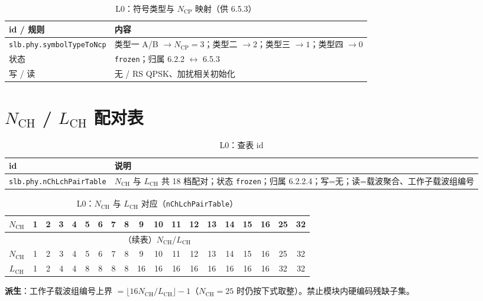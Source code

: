 \documentclass[11pt,a4paper]{ctexart}
\begin{document}
\begin{longtable}{L{4.5cm}L{10.2cm}}
\caption{L0：符号类型与 $N_{\mathrm{CP}}$ 映射（供 6.5.3）\label{tab:l0-ncp}} \\
\toprule
\textbf{id / 规则} & \textbf{内容} \\
\midrule
\texttt{slb.phy.symbolTypeToNcp} &
类型一 A/B $\rightarrow N_{\mathrm{CP}}=3$；类型二 $\rightarrow 2$；类型三 $\rightarrow 1$；类型四 $\rightarrow 0$ \\
状态 & \texttt{frozen}；归属 6.2.2 $\leftrightarrow$ 6.5.3 \\
写 / 读 & 无 / RS QPSK、加扰相关初始化 \\
\bottomrule
\end{longtable}

\section{$N_{\mathrm{CH}}$ / $L_{\mathrm{CH}}$ 配对表}

\begin{longtable}{L{4.5cm}L{10.2cm}}
\caption{L0：查表 id\label{tab:l0-nch-id}} \\
\toprule
\textbf{id} & \textbf{说明} \\
\midrule
\texttt{slb.phy.nChLchPairTable} &
$N_{\mathrm{CH}}$ 与 $L_{\mathrm{CH}}$ 共 18 档配对；状态 \texttt{frozen}；归属 6.2.2.4；写=无；读=载波聚合、工作子载波组编号 \\
\bottomrule
\end{longtable}

\begin{longtable}{c*{18}{c}}
\caption{L0：$N_{\mathrm{CH}}$ 与 $L_{\mathrm{CH}}$ 对应（\texttt{nChLchPairTable}）\label{tab:l0-nch-lch}} \\
\toprule
$N_{\mathrm{CH}}$ &
1 & 2 & 3 & 4 & 5 & 6 & 7 & 8 & 9 & 10 & 11 & 12 & 13 & 14 & 15 & 16 & 25 & 32 \\
\midrule
\endfirsthead
\multicolumn{19}{c}{\small（续表）$N_{\mathrm{CH}}$/$L_{\mathrm{CH}}$} \\
\toprule
$N_{\mathrm{CH}}$ &
1 & 2 & 3 & 4 & 5 & 6 & 7 & 8 & 9 & 10 & 11 & 12 & 13 & 14 & 15 & 16 & 25 & 32 \\
\midrule
\endhead
\bottomrule
\endfoot
$L_{\mathrm{CH}}$ &
1 & 2 & 4 & 4 & 8 & 8 & 8 & 8 & 16 & 16 & 16 & 16 & 16 & 16 & 16 & 16 & 32 & 32 \\
\end{longtable}

\noindent\textbf{派生}：工作子载波组编号上界 $=\lfloor 16 N_{\mathrm{CH}}/L_{\mathrm{CH}} \rfloor - 1$（$N_{\mathrm{CH}}=25$ 时仍按下式取整）。禁止模块内硬编码残缺子集。
\end{document}

